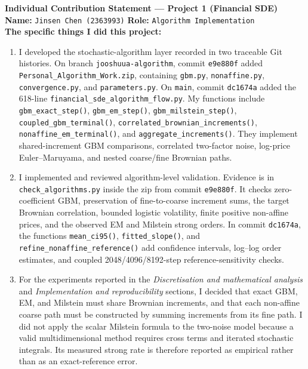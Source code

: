 \documentclass[11pt,a4paper]{article}
\theoremstyle{definition}
\theoremstyle{remark}
\begin{document}
\newpage




\begin{formbox}
\textbf{Individual Contribution Statement --- Project 1 (Financial SDE)}\\[0.4em]

\textbf{Name:} \texttt{Jinsen Chen (2363993)}
\hfill
\textbf{Role:} \texttt{Algorithm Implementation}\\[0.4em]

\textbf{The specific things I did this project:}

\begin{enumerate}[leftmargin=2em]

\item I developed the stochastic-algorithm layer recorded in two traceable
Git histories. On branch \texttt{jooshuua-algorithm}, commit
\texttt{e9e880f} added \texttt{Personal\_Algorithm\_Work.zip}, containing
\texttt{gbm.py}, \texttt{nonaffine.py}, \texttt{convergence.py}, and
\texttt{parameters.py}. On \texttt{main}, commit \texttt{dc1674a} added the
618-line \texttt{financial\_sde\_algorithm\_flow.py}. My functions include
\texttt{gbm\_exact\_step()}, \texttt{gbm\_em\_step()},
\texttt{gbm\_milstein\_step()}, \texttt{coupled\_gbm\_terminal()},
\texttt{correlated\_brownian\_increments()},
\texttt{nonaffine\_em\_terminal()}, and \texttt{aggregate\_increments()}.
They implement shared-increment GBM comparisons, correlated two-factor
noise, log-price Euler--Maruyama, and nested coarse/fine Brownian paths.

\item I implemented and reviewed algorithm-level validation. Evidence is in
\texttt{check\_algorithms.py} inside the zip from commit \texttt{e9e880f}.
It checks zero-coefficient GBM, preservation of fine-to-coarse increment
sums, the target Brownian correlation, bounded logistic volatility, finite
positive non-affine prices, and the observed EM and Milstein strong orders.
In commit \texttt{dc1674a}, the functions \texttt{mean\_ci95()},
\texttt{fitted\_slope()}, and \texttt{refine\_nonaffine\_reference()} add
confidence intervals, log--log order estimates, and coupled
2048/4096/8192-step reference-sensitivity checks.

\item For the experiments reported in the \emph{Discretisation and
mathematical analysis} and \emph{Implementation and reproducibility}
sections, I decided that exact GBM, EM, and Milstein must share Brownian
increments, and that each non-affine coarse path must be constructed by
summing increments from its fine path. I did not apply the scalar Milstein
formula to the two-noise model because a valid multidimensional method
requires cross terms and iterated stochastic integrals. Its measured strong
rate is therefore reported as empirical rather than as an exact-reference
error.


\end{enumerate}
\end{formbox}
\end{document}
